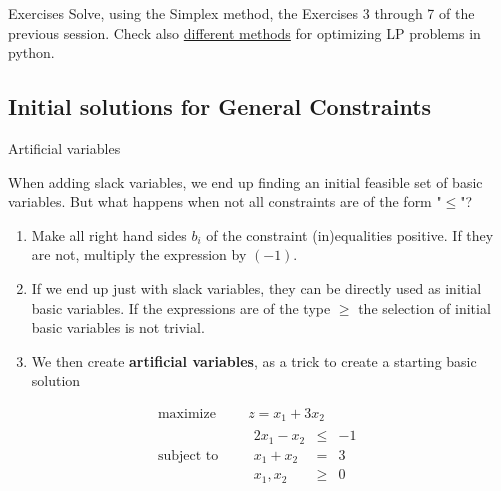 \documentclass[c]{beamer}
\begin{document}
\begin{frame}{Exercises}
  Solve, using the Simplex method, the Exercises 3 through 7 of the previous session. Check also \href{https://realpython.com/linear-programming-python/}{different methods} for optimizing LP problems in python.
\end{frame}

\subsection{Initial solutions for General Constraints}

\begin{frame}{Artificial variables}

  When adding slack variables, we end up finding an initial feasible set of basic variables. But what happens when not all constraints are of the form "$\leq$"?\cite{carter}

  \begin{enumerate}
    \item Make all right hand sides $b_i$ of the constraint (in)equalities positive. If they are not, multiply the expression by $(-1)$.
    \item If we end up just with slack variables, they can be directly used as initial basic variables. If the expressions are of the type $\geq$ the selection of initial basic variables is not trivial.
    \item We then create {\bf artificial variables}, as a trick to create a starting basic solution
  \end{enumerate}
  \begin{equation*}
    \begin{aligned}
      \text{maximize } \quad & z = x_1+3x_2 \\
      \text{subject to }\quad &
      \begin{array}{rcl}
        2x_1 -x_2 &\leq &-1 \\
        x_1+x_2 &= &3 \\
        x_1,x_2 &\geq& 0
      \end{array}
    \end{aligned}
  \end{equation*}
\end{frame}
\end{document}
